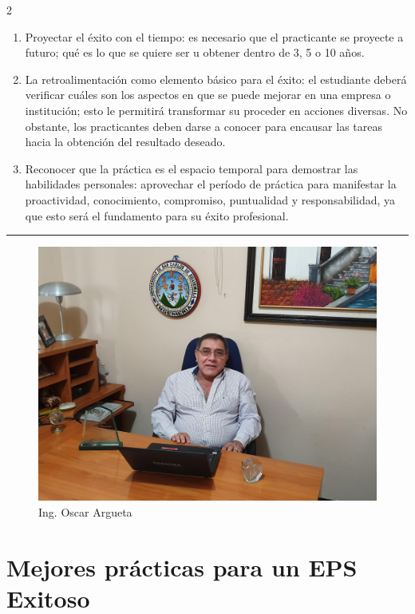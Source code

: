 \documentclass[11pt,spanish,Letterpaper,openany]{book}
\begin{document}
\begin {multicols}{2}
\begin{enumerate}
\item
  Proyectar el éxito con el tiempo: es necesario que el practicante se proyecte a futuro; qué es lo que se quiere ser u obtener dentro de 3, 5 o 10 años.
\item
  La retroalimentación como elemento básico para el éxito: el estudiante deberá verificar cuáles son los aspectos en que se puede mejorar en una empresa o institución; esto le permitirá transformar su proceder en acciones diversas. No obstante, los practicantes deben darse a conocer para encausar las tareas hacia la obtención del resultado deseado.
\item
  Reconocer que la práctica es el espacio temporal para demostrar las habilidades personales: aprovechar el período de práctica para manifestar la proactividad, conocimiento, compromiso, puntualidad y responsabilidad, ya que esto será el fundamento para su éxito profesional.
\end{enumerate}

\end {multicols}

\begin{center}\rule{0.5\linewidth}{\linethickness}\end{center}

\begin{figure}[H]

{\centering \includegraphics[width=0.8\linewidth]{images/201901-oargueta-imagen01} 

}

\caption{Ing. Oscar Argueta}\label{fig:unnamed-chunk-8}
\end{figure}

\hypertarget{bfuentes}{%
\chapter{Mejores prácticas para un EPS Exitoso}\label{bfuentes}}
\end{document}
